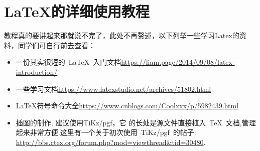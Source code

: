 \chapter{LaTeX的详细使用教程}
教程真的要讲起来那就说不完了，此处不再赘述，以下列举一些学习Latex的资料，同学们可自行前去查看：
\begin{itemize}
\item 一份其实很短的~\LaTeX~入门文档\url{https://liam.page/2014/09/08/latex-introduction/}

\item 一些学习文档\url{https://www.latexstudio.net/archives/51802.html}

\item LaTeX符号命令大全\url{https://www.cnblogs.com/Coolxxx/p/5982439.html}

\item 插图的制作, 建议使用TiKz/pgf，它 的长处是源文件直接植入~\TeX~文档,管理起来非常方便.这里有一个关于初次使用~TiKz/pgf~的帖子: \url{http://bbs.ctex.org/forum.php?mod=viewthread&tid=30480}.

\end{itemize}
